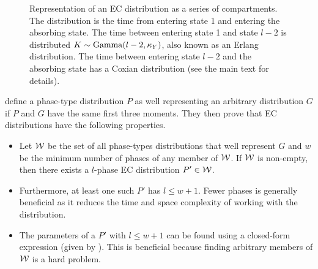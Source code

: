 \documentclass[thesis.tex]{subfiles}
\begin{document}
\begin{figure}
\caption[A $l$ phase EC distribution.]{Representation of an EC distribution as a series of compartments. The distribution is the time from entering state 1 and entering the absorbing state. The time between entering state 1 and state $l-2$ is distributed $K \sim \operatorname{Gamma}(l-2, \kappa_Y)$, also known as an Erlang distribution. The time between entering state $l-2$ and the absorbing state has a Coxian distribution (see the main text for details).}
\label{SEIR:fig:EC}
\end{figure}

\Textcite{osogamiClosed} define a phase-type distribution $P$ as well representing an arbitrary distribution $G$ if $P$ and $G$ have the same first three moments.
They then prove that EC distributions have the following properties.
\begin{itemize}
    \item Let $\mathcal{W}$ be the set of all phase-types distributions that well represent $G$ and $w$ be the minimum number of phases of any member of $\mathcal{W}$. If $\mathcal{W}$ is non-empty, then there exists a $l$-phase EC distribution $P' \in \mathcal{W}$.
    \item Furthermore, at least one such $P'$ has $l \leq w + 1$. Fewer phases is generally beneficial as it reduces the time and space complexity of working with the distribution.
    \item The parameters of a $P'$ with $l \leq w + 1$ can be found using a closed-form expression (given by \textcite{osogamiClosed}). This is beneficial because finding arbitrary members of $\mathcal{W}$ is a hard problem.
\end{itemize}
\end{document}
